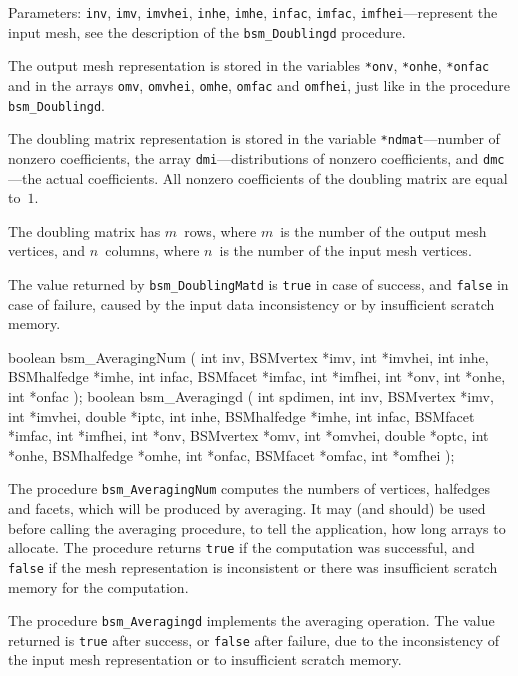 Parameters: \texttt{inv}, \texttt{imv}, \texttt{imvhei}, \texttt{inhe},
\texttt{imhe}, \texttt{infac}, \texttt{imfac}, \texttt{imfhei}---represent
the input mesh, see the description of the \texttt{bsm\_Doublingd}
procedure.

The output mesh representation is stored in the variables \texttt{*onv},
\texttt{*onhe}, \texttt{*onfac} and in the arrays \texttt{omv},
\texttt{omvhei}, \texttt{omhe}, \texttt{omfac} and \texttt{omfhei}, just
like in the procedure \texttt{bsm\_Doublingd}.

The doubling matrix representation is stored in the variable
\texttt{*ndmat}---number of nonzero coefficients, the array
\texttt{dmi}---distributions of nonzero coefficients, and \texttt{dmc}---the
actual coefficients. All nonzero coefficients of the doubling matrix are
equal to~$1$.

The doubling matrix has $m$~rows, where $m$~is the number of the output
mesh vertices, and $n$~columns, where $n$~is the number of the input mesh
vertices.

The value returned by \texttt{bsm\_DoublingMatd} is \texttt{true} in case of
success, and \texttt{false} in case of failure, caused by the input data
inconsistency or by insufficient scratch memory.


\medskip
\begin{listingC}
boolean bsm_AveragingNum ( int inv, BSMvertex *imv, int *imvhei,
                           int inhe, BSMhalfedge *imhe,
                           int infac, BSMfacet *imfac, int *imfhei,
                           int *onv, int *onhe, int *onfac );
boolean bsm_Averagingd ( int spdimen,
                 int inv, BSMvertex *imv, int *imvhei, double *iptc,
                 int inhe, BSMhalfedge *imhe,
                 int infac, BSMfacet *imfac, int *imfhei,
                 int *onv, BSMvertex *omv, int *omvhei, double
                 *optc,
                 int *onhe, BSMhalfedge *omhe,
                 int *onfac, BSMfacet *omfac, int *omfhei );
\end{listingC}
The procedure \texttt{bsm\_AveragingNum} computes the numbers of vertices,
halfedges and facets, which will be produced by averaging. It may (and
should) be used before calling the averaging procedure, to tell the
application, how long arrays to allocate. The procedure returns \texttt{true}
if the computation was successful, and \texttt{false} if the mesh
representation is inconsistent or there was insufficient scratch memory for
the computation.

The procedure \texttt{bsm\_Averagingd} implements the averaging operation.
The value returned is \texttt{true} after success, or \texttt{false} after
failure, due to the inconsistency of the input mesh representation or to
insufficient scratch memory.

